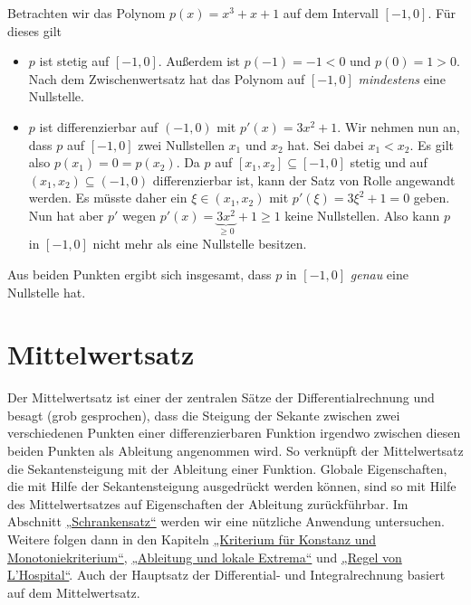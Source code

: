 \documentclass[fontsize=9pt,
               parskip=half-,
               DIV=14,
               listof=chapterentry,
               tocflat]{scrbook}
\begin{document}
\begin{example*}
Betrachten wir das Polynom $p(x)=x^{3}+x+1$ auf dem Intervall $[-1,0]$. Für dieses gilt

\begin{itemize}
\item $p$ ist stetig auf $[-1,0]$. Außerdem ist $p(-1)=-1<0$ und $p(0)=1>0$. Nach dem Zwischenwertsatz hat das Polynom auf $[-1,0]$ \emph{mindestens} eine Nullstelle.
\item $p$ ist differenzierbar auf $(-1,0)$ mit $p'(x)=3x^{2}+1$. Wir nehmen nun an, dass $p$ auf $[-1,0]$ zwei Nullstellen $x_{1}$ und $x_{2}$ hat. Sei dabei $x_{1}<x_{2}$. Es gilt also $p(x_{1})=0=p(x_{2})$. Da $p$ auf $[x_{1},x_{2}]\subseteq [-1,0]$ stetig und auf $(x_{1},x_{2})\subseteq (-1,0)$ differenzierbar ist, kann der Satz von Rolle angewandt werden. Es müsste daher ein $\xi \in (x_{1},x_{2})$ mit $p'(\xi )=3\xi ^{2}+1=0$ geben. Nun hat aber $p'$ wegen $p'(x)=\underbrace {3x^{2}} _{\geq 0}+1\geq 1$ keine Nullstellen. Also kann $p$ in $[-1,0]$ nicht mehr als eine Nullstelle besitzen.
\end{itemize}

Aus beiden Punkten ergibt sich insgesamt, dass $p$ in $[-1,0]$ \emph{genau} eine Nullstelle hat.

\end{example*}

\chapter{Mittelwertsatz}

Der Mittelwertsatz ist einer der zentralen Sätze der Differentialrechnung und besagt (grob gesprochen), dass die Steigung der Sekante zwischen zwei verschiedenen Punkten einer differenzierbaren Funktion irgendwo zwischen diesen beiden Punkten als Ableitung angenommen wird. So verknüpft der Mittelwertsatz die Sekantensteigung mit der Ableitung einer Funktion. Globale Eigenschaften, die mit Hilfe der Sekantensteigung ausgedrückt werden können, sind so mit Hilfe des Mittelwertsatzes auf Eigenschaften der Ableitung zurückführbar. Im Abschnitt \href{https://de.wikibooks.org/wiki/Mathe\_für\_Nicht-Freaks:\_Mittelwertsatz\#Anker:Schrankensatz}
{„Schrankensatz“} werden wir eine nützliche Anwendung untersuchen. Weitere folgen dann in den Kapiteln \href{https://de.wikibooks.org/wiki/Mathe\_für\_Nicht-Freaks:\_Konstanzkriterium:\_Zusammenhang\_zwischen\_Konstanz\_einer\_Funktion\_und\_ihrer\_Ableitung}
{„Kriterium für Konstanz und Monotoniekriterium“}, \href{https://de.wikibooks.org/wiki/Mathe\_für\_Nicht-Freaks:\_Ableitung\_und\_lokale\_Extrema}
{„Ableitung und lokale Extrema“} und \href{https://de.wikibooks.org/wiki/Mathe\_für\_Nicht-Freaks:\_Regel\_von\_L'Hospital}
{„Regel von L'Hospital“}. Auch der Hauptsatz der Differential- und Integralrechnung basiert auf dem Mittelwertsatz.
\end{document}
